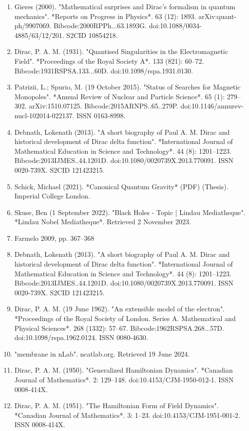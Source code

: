 \begin{enumerate}
\item Gieres (2000). "Mathematical surprises and Dirac's formalism in quantum mechanics". *Reports on Progress in Physics*. 63 (12): 1893. arXiv:quant-ph/9907069. Bibcode:2000RPPh...63.1893G. doi:10.1088/0034-4885/63/12/201. S2CID 10854218.
\item Dirac, P. A. M. (1931). "Quantised Singularities in the Electromagnetic Field". *Proceedings of the Royal Society A*. 133 (821): 60–72. Bibcode:1931RSPSA.133...60D. doi:10.1098/rspa.1931.0130.
\item Patrizii, L.; Spurio, M. (19 October 2015). "Status of Searches for Magnetic Monopoles". *Annual Review of Nuclear and Particle Science*. 65 (1): 279–302. arXiv:1510.07125. Bibcode:2015ARNPS..65..279P. doi:10.1146/annurev-nucl-102014-022137. ISSN 0163-8998.
\item Debnath, Lokenath (2013). "A short biography of Paul A. M. Dirac and historical development of Dirac delta function". *International Journal of Mathematical Education in Science and Technology*. 44 (8): 1201–1223. Bibcode:2013IJMES..44.1201D. doi:10.1080/0020739X.2013.770091. ISSN 0020-739X. S2CID 121423215.
\item Schick, Michael (2021). *Canonical Quantum Gravity* (PDF) (Thesis). Imperial College London.
\item Skuse, Ben (1 September 2022). "Black Holes - Topic | Lindau Mediatheque". *Lindau Nobel Mediatheque*. Retrieved 2 November 2023.
\item Farmelo 2009, pp. 367–368
\item Debnath, Lokenath (2013). "A short biography of Paul A. M. Dirac and historical development of Dirac delta function". *International Journal of Mathematical Education in Science and Technology*. 44 (8): 1201–1223. Bibcode:2013IJMES..44.1201D. doi:10.1080/0020739X.2013.770091. ISSN 0020-739X. S2CID 121423215.
\item Dirac, P. A. M. (19 June 1962). "An extensible model of the electron". *Proceedings of the Royal Society of London. Series A. Mathematical and Physical Sciences*. 268 (1332): 57–67. Bibcode:1962RSPSA.268...57D. doi:10.1098/rspa.1962.0124. ISSN 0080-4630.
\item "membrane in nLab". ncatlab.org. Retrieved 19 June 2024.
\item Dirac, P. A. M. (1950). "Generalized Hamiltonian Dynamics". *Canadian Journal of Mathematics*. 2: 129–148. doi:10.4153/CJM-1950-012-1. ISSN 0008-414X.
\item Dirac, P. A. M. (1951). "The Hamiltonian Form of Field Dynamics". *Canadian Journal of Mathematics*. 3: 1–23. doi:10.4153/CJM-1951-001-2. ISSN 0008-414X.

\end{enumerate}
